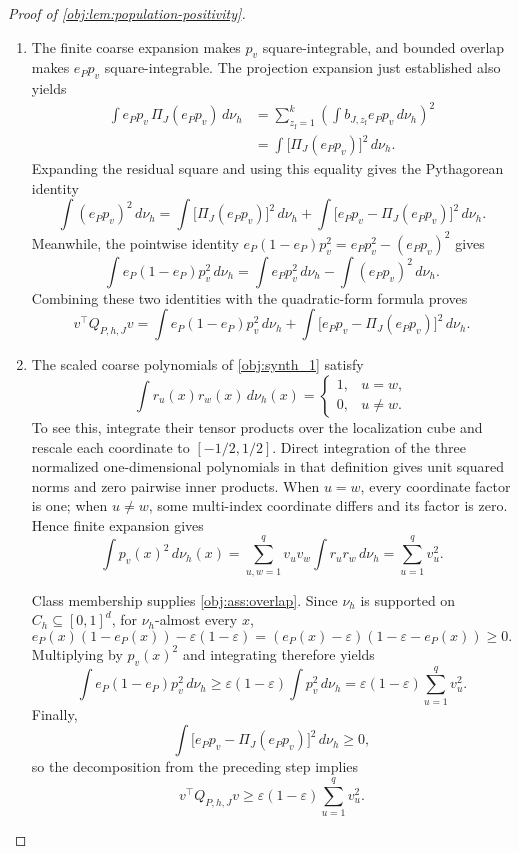 \documentclass[11pt]{article}
\begin{document}
\begin{proof}[Proof of \cref{obj:lem:population-positivity}]
\begin{enumerate}
\item The finite coarse expansion makes \(p_v\) square-integrable, and bounded overlap makes \(e_Pp_v\) square-integrable. The projection expansion just established also yields
\[
\begin{aligned}
\int e_Pp_v\,\Pi_J(e_Pp_v)\,d\nu_h
&=\sum_{z_{\mathrm f}=1}^{k}
 \left(\int b_{J,z_{\mathrm f}}e_Pp_v\,d\nu_h\right)^2\\
&=\int \bigl[\Pi_J(e_Pp_v)\bigr]^2\,d\nu_h.
\end{aligned}
\]
Expanding the residual square and using this equality gives the Pythagorean identity
\[
\int (e_Pp_v)^2\,d\nu_h
=
\int \bigl[\Pi_J(e_Pp_v)\bigr]^2\,d\nu_h
+\int \bigl[e_Pp_v-\Pi_J(e_Pp_v)\bigr]^2\,d\nu_h.
\]
Meanwhile, the pointwise identity
\(e_P(1-e_P)p_v^2=e_Pp_v^2-(e_Pp_v)^2\) gives
\[
\int e_P(1-e_P)p_v^2\,d\nu_h
=
\int e_Pp_v^2\,d\nu_h-\int(e_Pp_v)^2\,d\nu_h.
\]
Combining these two identities with the quadratic-form formula proves
\[
v^\top Q_{P,h,J}v
=
\int e_P(1-e_P)p_v^2\,d\nu_h
+\int\bigl[e_Pp_v-\Pi_J(e_Pp_v)\bigr]^2\,d\nu_h.
\]

\item The scaled coarse polynomials of \cref{obj:synth_1} satisfy
\[
\int r_u(x)r_w(x)\,d\nu_h(x)
=
\begin{cases}
1,&u=w,\\
0,&u\ne w.
\end{cases}
\]
To see this, integrate their tensor products over the localization cube and rescale each coordinate to \([-1/2,1/2]\). Direct integration of the three normalized one-dimensional polynomials in that definition gives unit squared norms and zero pairwise inner products. When \(u=w\), every coordinate factor is one; when \(u\ne w\), some multi-index coordinate differs and its factor is zero. Hence finite expansion gives
\[
\int p_v(x)^2\,d\nu_h(x)
=\sum_{u,w=1}^{q}v_uv_w\int r_ur_w\,d\nu_h
=\sum_{u=1}^{q}v_u^2.
\]

Class membership supplies \cref{obj:ass:overlap}. Since \(\nu_h\) is supported on \(C_h\subseteq[0,1]^d\), for \(\nu_h\)-almost every \(x\),
\[
e_P(x)(1-e_P(x))-\varepsilon(1-\varepsilon)
=
\left(e_P(x)-\varepsilon\right)
\left(1-\varepsilon-e_P(x)\right)
\ge0.
\]
Multiplying by \(p_v(x)^2\) and integrating therefore yields
\[
\int e_P(1-e_P)p_v^2\,d\nu_h
\ge\varepsilon(1-\varepsilon)\int p_v^2\,d\nu_h
=\varepsilon(1-\varepsilon)\sum_{u=1}^{q}v_u^2.
\]
Finally,
\[
\int\bigl[e_Pp_v-\Pi_J(e_Pp_v)\bigr]^2\,d\nu_h\ge0,
\]
so the decomposition from the preceding step implies
\[
v^\top Q_{P,h,J}v\ge\varepsilon(1-\varepsilon)\sum_{u=1}^{q}v_u^2.
\]
\end{enumerate}
\end{proof}
\end{document}
